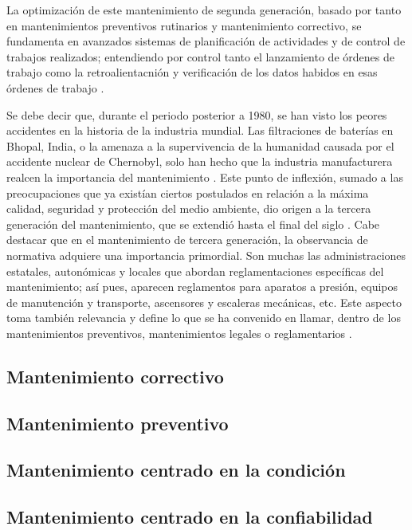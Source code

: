La optimización de este mantenimiento de segunda generación, basado por tanto en mantenimientos preventivos rutinarios y mantenimiento correctivo, se fundamenta en avanzados sistemas de planificación de actividades y de control de trabajos realizados; entendiendo por control tanto el lanzamiento de órdenes de trabajo como la retroalientacnión y verificación de los datos habidos en esas órdenes de trabajo \citep{gonzalez2005}.

Se debe decir que, durante el periodo posterior a 1980, se han visto los peores accidentes en la historia de la industria mundial. Las filtraciones de baterías en Bhopal, India, o  la amenaza a la supervivencia de la humanidad causada por el accidente nuclear de Chernobyl, solo han hecho que la industria manufacturera realcen la importancia del mantenimiento \citep{shenoy2005}. Este punto de inflexión, sumado a las preocupaciones que ya existían ciertos postulados en relación a la máxima calidad, seguridad y protección del medio ambiente, dio origen a la tercera generación del mantenimiento, que se extendió hasta el final del siglo \citep{garcia2012}. Cabe destacar que en el mantenimiento de tercera generación, la observancia de normativa adquiere una importancia primordial. Son muchas las administraciones estatales, autonómicas y locales que abordan reglamentaciones específicas del mantenimiento; así pues, aparecen reglamentos para aparatos a presión, equipos de manutención y transporte, ascensores y escaleras mecánicas, etc. Este aspecto toma también relevancia y define lo que se ha convenido en llamar, dentro de los mantenimientos preventivos, mantenimientos legales o reglamentarios \citep{gonzalez2005}.    



\subsection{Mantenimiento correctivo}

\subsection{Mantenimiento preventivo}

\subsection{Mantenimiento centrado en la condición}

\subsection{Mantenimiento centrado en la confiabilidad}


